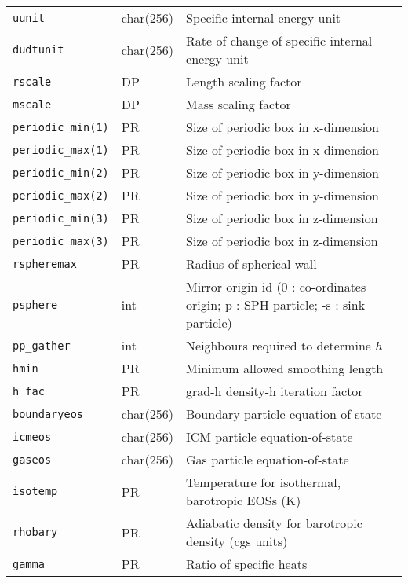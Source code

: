 \documentclass[a4paper]{article}
\newcommand{\var}[1]{\texttt{#1}}
\begin{document}
\begin{center}
\begin{supertabular}{|p{3cm}|p{2cm}|p{8cm}|}
\var{uunit}      & char(256) & Specific internal energy unit \\
\var{dudtunit}   & char(256) & Rate of change of specific internal energy unit \\
\var{rscale}     & DP        & Length scaling factor \\
\var{mscale}     & DP        & Mass scaling factor \\ \hline
\var{periodic\_min(1)} & PR & Size of periodic box in x-dimension \\
\var{periodic\_max(1)} & PR & Size of periodic box in x-dimension \\
\var{periodic\_min(2)} & PR & Size of periodic box in y-dimension \\
\var{periodic\_max(2)} & PR & Size of periodic box in y-dimension \\
\var{periodic\_min(3)} & PR & Size of periodic box in z-dimension \\
\var{periodic\_max(3)} & PR & Size of periodic box in z-dimension \\ 
\var{rspheremax}       & PR & Radius of spherical wall \\ 
\var{psphere}    & int      & Mirror origin id (0 : co-ordinates origin; p : SPH particle; -s : sink particle) \\ \hline
%
\var{pp\_gather} & int      & Neighbours required to determine $h$ \\
\var{hmin}       & PR       & Minimum allowed smoothing length \\
\var{h\_fac}     & PR       & grad-h density-h iteration factor \\ \hline
\var{boundaryeos}& char(256)& Boundary particle equation-of-state \\
\var{icmeos}     & char(256)& ICM particle equation-of-state \\
\var{gaseos}     & char(256)& Gas particle equation-of-state \\
\var{isotemp}    & PR       & Temperature for isothermal, barotropic EOSs (K) \\
\var{rhobary}    & PR       & Adiabatic density for barotropic density (cgs units) \\
\var{gamma}      & PR       & Ratio of specific heats \\

\end{supertabular}
\end{center}
\end{document}
